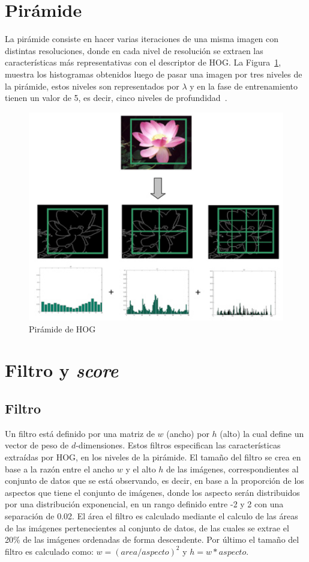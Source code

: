 \section{Pirámide}\label{sec:pyra}
La pirámide consiste en hacer varias iteraciones de una misma imagen con distintas resoluciones, donde en cada nivel de resolución se extraen las características más representativas con el descriptor de HOG\@. La Figura~\ref{fig:hog_pyra}, muestra los histogramas obtenidos luego de pasar una imagen por tres niveles de la pirámide, estos niveles son representados por $\lambda$ y en la fase de entrenamiento tienen un valor de 5, es decir, cinco niveles de profundidad~\cite{Felzenszwalb2010}.

\begin{figure}[tb]
 \centering
  \includegraphics[width=1\textwidth]{Figuras/phog.jpg}
  \caption[Pirámide de HOG]{Pirámide de HOG~\cite{pyra}}
  \label{fig:hog_pyra}
\end{figure}

\section{Filtro y \textit{score}}\label{sec:fas}

\subsection{Filtro}
Un filtro está definido por una matriz de $w$ (ancho) por $h$ (alto) la cual define un vector de peso de $d$-dimensiones. Estos filtros especifican las características extraídas por HOG, en los niveles de la pirámide. El tamaño del filtro se crea en base a la razón entre el ancho $w$ y el alto $h$ de las imágenes, correspondientes al conjunto de datos que se está observando, es decir, en base a la proporción de los aspectos que tiene el conjunto de imágenes, donde los aspecto serán distribuidos por una distribución exponencial, en un rango definido entre -2 y 2 con una separación de 0.02. El área el filtro es calculado mediante el calculo de las áreas de las imágenes pertenecientes al conjunto de datos, de las cuales se extrae el 20\% de las imágenes ordenadas de forma descendente. Por último el tamaño del filtro es calculado como: $w = (area/aspecto)^2$ y $h = w*aspecto$.

